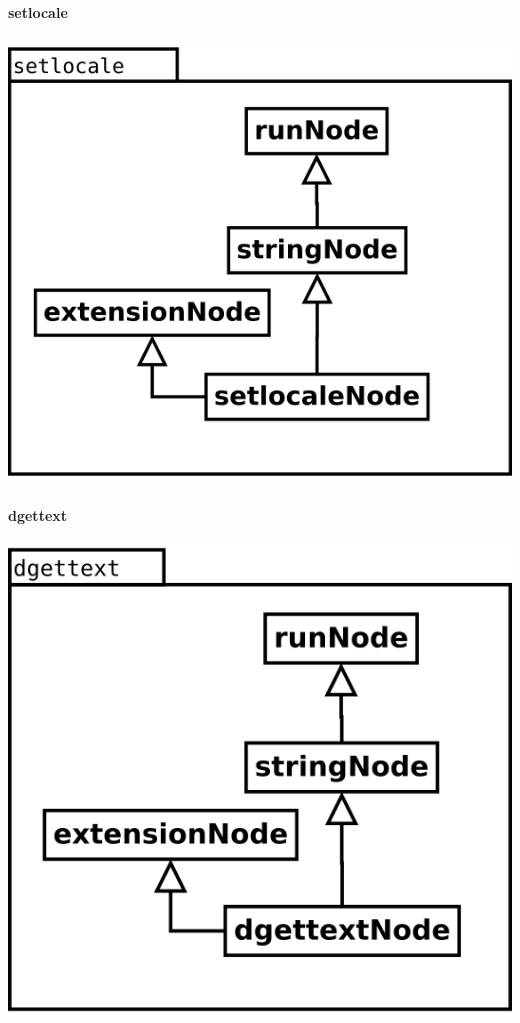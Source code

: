 \begin{multicols}{2}
\paragraph {setlocale}
\begin{center}
\includegraphics[scale=0.4]{setlocale.png} \\
\end{center}
\paragraph {dgettext}
\begin{center}
\includegraphics[scale=0.4]{dgettext.png} \\
\end{center}
\columnbreak

\end{multicols}
